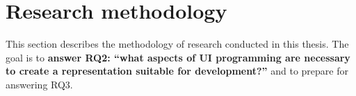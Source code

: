 \chapter{Research methodology}\label{ch:research-methodology}

This section describes the methodology of research conducted in this thesis.
The goal is to \textbf{answer RQ2: \enquote{what aspects of UI programming are necessary to create a representation suitable for development?}} and to prepare for answering RQ3.





